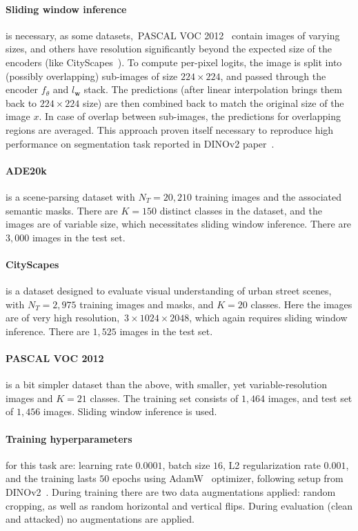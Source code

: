 \paragraph{Sliding window inference} is necessary, as some datasets,~\eg PASCAL VOC 2012~\cite{pascalvoc2012} contain images of varying sizes, and others have resolution significantly beyond the expected size of the encoders (like CityScapes~\cite{cityscapes}). To compute per-pixel logits, the image is split into (possibly overlapping) sub-images of size $224\times 224$, and passed through the encoder $f_\theta$ and $l_\mathbf{w}$ stack. The predictions (after linear interpolation brings them back to $224\times 224$ size) are then combined back to match the original size of the image $x$. In case of overlap between sub-images, the predictions for overlapping regions are averaged. This approach proven itself necessary to reproduce high performance on segmentation task reported in DINOv2 paper~\cite{dinov2}.

\paragraph{ADE20k~\cite{ADE20k1,ADE20k2}} is a scene-parsing dataset with $N_T=20,210$ training images and the associated semantic masks. There are $K=150$ distinct classes in the dataset, and the images are of variable size, which necessitates sliding window inference. There are $3,000$ images in the test set.

\paragraph{CityScapes~\cite{cityscapes}} is a dataset designed to evaluate visual understanding of urban street scenes, with $N_T=2,975$ training images and masks, and $K=20$ classes. Here the images are of very high resolution,~\ie $3\times 1024\times 2048$, which again requires sliding window inference. There are $1,525$ images in the test set.

\paragraph{PASCAL VOC 2012~\cite{pascalvoc2012}} is a bit simpler dataset than the above, with smaller, yet variable-resolution images and $K=21$ classes. The training set consists of $1,464$ images, and test set of $1,456$ images. Sliding window inference is used.


\paragraph{Training hyperparameters} for this task are: learning rate $0.0001$, batch size $16$, L2 regularization rate $0.001$, and the training lasts $50$ epochs using AdamW~\cite{adamw} optimizer, following setup from DINOv2~\cite{dinov2}. During training there are two data augmentations applied: random cropping, as well as random horizontal and vertical flips. During evaluation (clean and attacked) no augmentations are applied.

